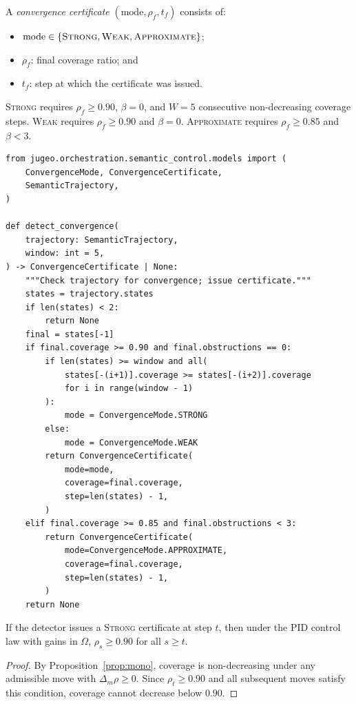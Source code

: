 \documentclass[11pt]{article}
\newcommand{\vcov}{\rho}                   %
\newcommand{\obcount}{\beta}              %
\newcommand{\GainRegion}{\Omega}           %
\begin{document}
\begin{definition}
  \label{def:cert}
  A \emph{convergence certificate} $(\mathrm{mode}, \vcov_f, t_f)$
  consists of:
  \begin{itemize}
    \item $\mathrm{mode} \in
          \{\textsc{Strong}, \textsc{Weak}, \textsc{Approximate}\}$;
    \item $\vcov_f$: final coverage ratio; and
    \item $t_f$: step at which the certificate was issued.
  \end{itemize}
  \textsc{Strong} requires $\vcov_f \geq 0.90$, $\obcount = 0$, and
  $W = 5$ consecutive non-decreasing coverage steps.
  \textsc{Weak} requires $\vcov_f \geq 0.90$ and $\obcount = 0$.
  \textsc{Approximate} requires $\vcov_f \geq 0.85$ and $\obcount < 3$.
\end{definition}

\begin{lstlisting}[style=jugeo-python,
  caption={Convergence detection and certificate issuance.},
  label={lst:convergence_api}]
from jugeo.orchestration.semantic_control.models import (
    ConvergenceMode, ConvergenceCertificate,
    SemanticTrajectory,
)

def detect_convergence(
    trajectory: SemanticTrajectory,
    window: int = 5,
) -> ConvergenceCertificate | None:
    """Check trajectory for convergence; issue certificate."""
    states = trajectory.states
    if len(states) < 2:
        return None
    final = states[-1]
    if final.coverage >= 0.90 and final.obstructions == 0:
        if len(states) >= window and all(
            states[-(i+1)].coverage >= states[-(i+2)].coverage
            for i in range(window - 1)
        ):
            mode = ConvergenceMode.STRONG
        else:
            mode = ConvergenceMode.WEAK
        return ConvergenceCertificate(
            mode=mode,
            coverage=final.coverage,
            step=len(states) - 1,
        )
    elif final.coverage >= 0.85 and final.obstructions < 3:
        return ConvergenceCertificate(
            mode=ConvergenceMode.APPROXIMATE,
            coverage=final.coverage,
            step=len(states) - 1,
        )
    return None
\end{lstlisting}

\begin{proposition}
  \label{prop:certsound}
  If the detector issues a \textsc{Strong} certificate at step $t$,
  then under the PID control law with gains in $\GainRegion$,
  $\vcov_s \geq 0.90$ for all $s \geq t$.
\end{proposition}
\begin{proof}
  By Proposition~\ref{prop:mono}, coverage is non-decreasing under any
  admissible move with $\Delta_m\vcov \geq 0$.  Since $\vcov_t \geq 0.90$
  and all subsequent moves satisfy this condition, coverage cannot
  decrease below $0.90$.
\end{proof}
\end{document}
